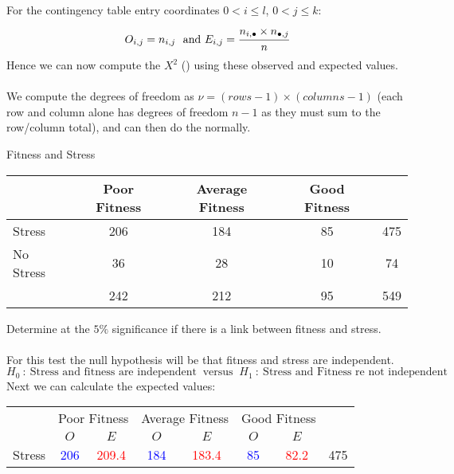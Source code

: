 \\
\\ For the contingency table entry coordinates $0 < i \leq l$, $0 < j \leq k$:
\[O_{i,j} = n_{i,j} \ \text{ and } E_{i,j} = \cfrac{n_{i, \bullet} \times n_{\bullet, j}}{n}\]
Hence we can now compute the $X^2$ () using these observed and expected values.
\\
\\ We compute the degrees of freedom as $\nu = (rows - 1) \times (columns - 1)$ (each row and column alone has degrees of freedom $n-1$ as they must sum to the row/column total), and can then do the  normally.
\begin{examplebox}{Fitness and Stress}
\begin{center}
	\begin{tabular}{l | c c c | c}
		          & Poor Fitness & Average Fitness & Good Fitness &     \\
		\hline
		Stress    & 206          & 184             & 85           & 475 \\
		No Stress & 36           & 28              & 10           & 74  \\
		\hline
		          & 242          & 212             & 95           & 549 \\
	\end{tabular}
\end{center}
Determine at the $5\%$ significance if there is a link between fitness and stress.
\\
\\ For this test the null hypothesis will be that fitness and stress are independent.
\[H_0 \ : \ \text{Stress and fitness are independent} \ \text{  versus  } \ H_1 \ : \ \text{Stress and Fitness re not independent}\]
Next we can calculate the expected values:
\begin{center}
	\begin{tabular}{l | c c c c c c | c}
		          & \multicolumn{2}{c}{Poor Fitness} & \multicolumn{2}{c}{Average Fitness} & \multicolumn{2}{c}{Good Fitness} &                                                                             \\
		          & $O$                              & $E$                                 & $O$                              & $E$                    & $O$                  & $E$                   &     \\
		\hline
		Stress    & \textcolor{blue}{206}            & \textcolor{red}{209.4}              & \textcolor{blue}{184}            & \textcolor{red}{183.4} & \textcolor{blue}{85} & \textcolor{red}{82.2} & 475 \\

\end{tabular}
\end{center}
\end{examplebox}
